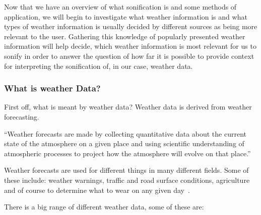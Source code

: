 Now that we have an overview of what sonification is and some methods of application, we will begin to investigate what weather information is and what types of weather information is usually decided by different sources as being more relevant to the user. 
Gathering this knowledge of popularly presented weather information will help decide, which weather information is most relevant for us to sonify in order to answer the question of how far it is possible to provide context for interpreting the sonification of, in our case, weather data.


\subsubsection{What is weather Data?} %
\label{ssub:what_is_weather_data_}
First off, what is meant by weather data? Weather data is derived from weather forecasting. 

\enquote{Weather forecasts are made by collecting quantitative data about the current state of the atmosphere on a given place and using scientific understanding of atmospheric processes to project how the atmosphere will evolve on that place.}~\cite*{Wiki2014-1}

Weather forecasts are used for different things in many different fields. Some of these include: weather warnings, traffic and road surface conditions, agriculture and of course to determine what to wear on any given day~\cite*{Wiki2014-1}.

There is a big range of different weather data, some of these are:


